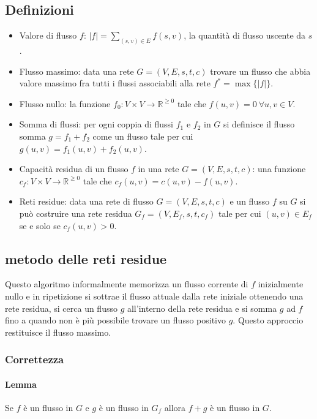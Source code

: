 \subsection{Definizioni}
\begin{itemize}
	\item Valore di flusso $f$: $|f| = \sum\limits_{(s, v)\in E} f(s, v)$, la quantit\`a di flusso uscente da $s$.
	\item Flusso massimo: data una rete $G=(V, E, s, t, c)$ trovare un flusso che abbia valore massimo fra tutti i flussi associabili alla rete $f^*=\max\{|f|\}$.
	\item Flusso nullo: la funzione $f_0: V\times V\rightarrow\mathbb{R}^{\ge 0}$ tale che $f(u, v) = 0\ \forall u, v\in V$.
	\item Somma di flussi: per ogni coppia di flussi $f_1$ e $f_2$ in $G$ si definisce il flusso somma $g= f_1+f_2$ come un flusso tale per cui $g(u, v) = f_1(u, v)+f_2(u, v)$.
	\item Capacit\`a residua di un flusso $f$ in una rete $G=(V, E, s, t, c)$: una funzione $c_f:V\times V\rightarrow\mathbb{R}^{\ge 0}$ tale che $c_f(u, v) = c(u, v)-f(u, v)$.
	\item Reti residue: data una rete di flusso $G=(V, E, s, t, c)$ e un flusso $f$ su $G$ si pu\`o costruire una rete residua $G_f=(V, E_f, s, t, c_f)$ tale per cui $(u, v)\in E_f$
		se e solo se $c_f(u, v)>0$.
\end{itemize}
\subsection{metodo delle reti residue}
Questo algoritmo informalmente memorizza un flusso corrente di $f$ inizialmente nullo e in ripetizione si sottrae il flusso attuale dalla rete iniziale ottenendo una rete residua, 
si cerca un flusso $g$ all'interno della rete residua e si somma $g$ ad $f$ fino a quando non \`e pi\`u possibile trovare un flusso positivo $g$. Questo approccio restituisce il flusso
massimo.\\

\subsubsection{Correttezza}
\paragraph{Lemma}
Se $f$ \`e un flusso in $G$ e $g$ \`e un flusso in $G_f$ allora $f+g$ \`e un flusso in $G$.
